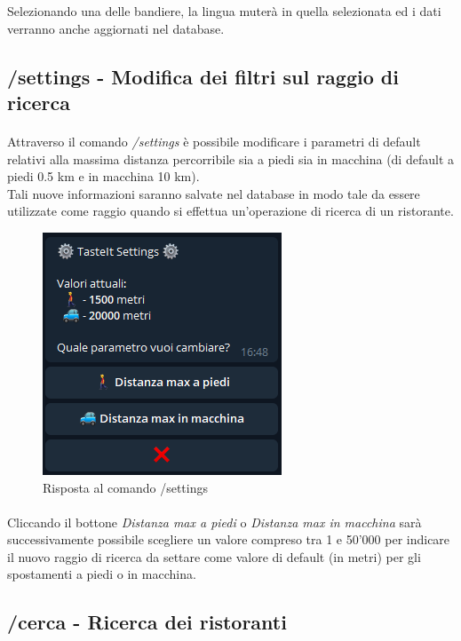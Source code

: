 \documentclass[a4paper, 12pt]{article}
\begin{document}
	Selezionando una delle bandiere, la lingua muterà in quella selezionata ed i dati verranno anche aggiornati nel database.
	
	\subsection{/settings - Modifica dei filtri sul raggio di ricerca}
	\paragraph{}
	Attraverso il comando \textit{/settings} è possibile modificare i parametri di default relativi alla massima distanza percorribile sia a piedi sia in macchina (di default a piedi 0.5 km e in macchina 10 km).\\
	Tali nuove informazioni saranno salvate nel database in modo tale da essere utilizzate come raggio quando si effettua un'operazione di ricerca di un ristorante.
	\newpage
	\begin{figure}[h]
		\centering
		\includegraphics[scale=0.9]{settingsCommand.png}
		\caption{Risposta al comando /settings}
	\end{figure}
	\paragraph{}
	Cliccando il bottone \textit{Distanza max a piedi} o \textit{Distanza max in macchina} sarà successivamente possibile scegliere un valore compreso tra 1 e 50'000 per indicare il nuovo raggio di ricerca da settare come valore di default (in metri) per gli spostamenti a piedi o in macchina.\\
	
	\subsection{/cerca - Ricerca dei ristoranti}
\end{document}
